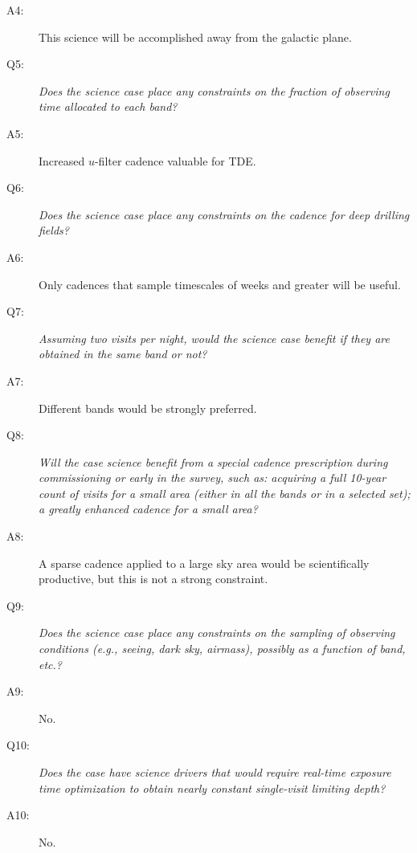 \begin{description}
 \item[A4:] This science will be accomplished away from the galactic plane.

 \item[Q5:] {\it Does the science case place any constraints on the
 fraction of observing time allocated to each band?}

 \item[A5:] Increased $u$-filter cadence valuable for TDE.

 \item[Q6:] {\it Does the science case place any constraints on the
 cadence for deep drilling fields?}

 \item[A6:] Only cadences that sample timescales of weeks and greater will be useful.

 \item[Q7:] {\it Assuming two visits per night, would the science case
 benefit if they are obtained in the same band or not?}

 \item[A7:] Different bands would be strongly preferred.

 \item[Q8:] {\it Will the case science benefit from a special cadence
 prescription during commissioning or early in the survey, such as:
 acquiring a full 10-year count of visits for a small area (either in all
 the bands or in a  selected set); a greatly enhanced cadence for a small
 area?}

 \item[A8:] A sparse cadence applied to a large sky area would be scientifically productive, but this is not a strong constraint.

 \item[Q9:] {\it Does the science case place any constraints on the
 sampling of observing conditions (e.g., seeing, dark sky, airmass),
 possibly as a function of band, etc.?}

 \item[A9:] No.

 \item[Q10:] {\it Does the case have science drivers that would require
 real-time exposure time optimization to obtain nearly constant
 single-visit limiting depth?}

 \item[A10:] No.

 \end{description}
